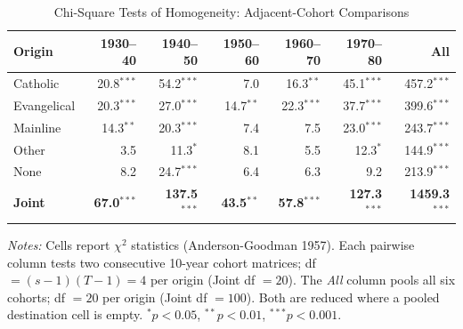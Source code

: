 \begin{table}[htbp]
\centering
\caption{Chi-Square Tests of Homogeneity: Adjacent-Cohort Comparisons}
\label{tab:pairwise}
\begin{tabular}{lrrrrrr}
\toprule
Origin & 1930--40 & 1940--50 & 1950--60 & 1960--70 & 1970--80 & All \\
\midrule
Catholic & 20.8$^{***}$ & 54.2$^{***}$ & 7.0 & 16.3$^{**}$ & 45.1$^{***}$ & 457.2$^{***}$ \\
Evangelical & 20.3$^{***}$ & 27.0$^{***}$ & 14.7$^{**}$ & 22.3$^{***}$ & 37.7$^{***}$ & 399.6$^{***}$ \\
Mainline & 14.3$^{**}$ & 20.3$^{***}$ & 7.4 & 7.5 & 23.0$^{***}$ & 243.7$^{***}$ \\
Other & 3.5 & 11.3$^{*}$ & 8.1 & 5.5 & 12.3$^{*}$ & 144.9$^{***}$ \\
None & 8.2 & 24.7$^{***}$ & 6.4 & 6.3 & 9.2 & 213.9$^{***}$ \\
\midrule
\textbf{Joint} & \textbf{67.0$^{***}$} & \textbf{137.5$^{***}$} & \textbf{43.5$^{**}$} & \textbf{57.8$^{***}$} & \textbf{127.3$^{***}$} & \textbf{1459.3$^{***}$} \\
\bottomrule
\end{tabular}
\begin{minipage}{\linewidth}
\vspace{0.5em}\footnotesize
\textit{Notes:} Cells report $\chi^2$ statistics (Anderson-Goodman 1957).
Each pairwise column tests two consecutive 10-year cohort matrices; df $= (s-1)(T-1) = 4$ per origin (Joint df $= 20$).
The \textit{All} column pools all six cohorts; df $= 20$ per origin (Joint df $= 100$).
Both are reduced where a pooled destination cell is empty.
$^{*}p<0.05$, $^{**}p<0.01$, $^{***}p<0.001$.
\end{minipage}
\end{table}
